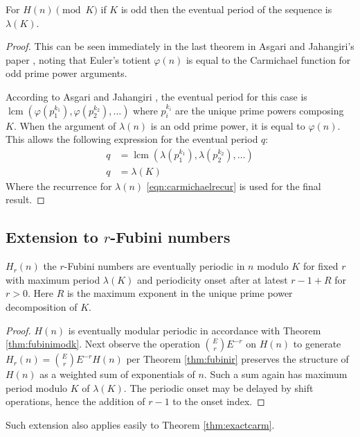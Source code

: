\documentclass[12pt,reqno]{article}
\DeclareMathOperator{\lcm}{lcm}
\begin{document}
\begin{theorem}
	For $H(n) \pmod {K}$ if $K$ is odd then the eventual period of the sequence is $\lambda(K)$.
	\begin{proof}
		This can be seen immediately in the last theorem in Asgari and Jahangiri's paper \cite{cc:asgari}, noting that Euler's totient $\varphi(n)$ is equal to the Carmichael function for odd prime power arguments.
		
		According to Asgari and Jahangiri \cite{cc:asgari}, the eventual period for this case is $\lcm(\varphi(p_{1}^{k_{1}}), \varphi(p_{2}^{k_{2}}), \ldots)$ where $p_{i}^{k_{i}}$ are the unique prime powers composing $K$. When the argument of $\lambda(n)$ is an odd prime power, it is equal to $\varphi(n)$. This allows the following expression for the eventual period $q$:
		\begin{align}
			q &= \lcm(\lambda(p_{1}^{k_{1}}), \lambda(p_{2}^{k_{2}}), \ldots) \\
			q &= \lambda(K)
		\end{align}
		Where the recurrence for $\lambda(n)$ \eqref{eqn:carmichaelrecur} is used for the final result.
		
	\end{proof}
	
\end{theorem}

\subsection{Extension to $r$-Fubini numbers}
\begin{corollary}
	$H_{r}(n)$ the $r$-Fubini numbers are eventually periodic in $n$ modulo $K$ for fixed $r$ with maximum period $\lambda(K)$ and periodicity onset after at latest $r - 1 + R$ for $r > 0$. Here $R$ is the maximum exponent in the unique prime power decomposition of $K$.

	\begin{proof}

		$H(n)$ is eventually modular periodic in accordance with Theorem \ref{thm:fubinimodk}. Next observe the operation $\binom{E}{r} E^{-r}$ on $H(n)$ to generate $H_{r}(n) = \binom{E}{r} E^{-r} H(n)$ per Theorem \ref{thm:fubinir} preserves the structure of $H(n)$ as a weighted sum of exponentials of $n$. Such a sum again has maximum period modulo $K$ of $\lambda(K)$. The periodic onset may be delayed by shift operations, hence the addition of $r - 1$ to the onset index.
	\end{proof}
\end{corollary}
Such extension also applies easily to Theorem \ref{thm:exactcarm}.
\end{document}
